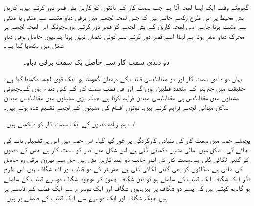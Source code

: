 گھومتے وقت ایک ایسا لمحہ آتا ہے جب سمت کار کے  دانتوں کو کاربن بش  قصر دور کرتے ہیں۔ کاربن بش  محیط پر اس طرح رکھے جاتے ہیں کہ جس لمحہ لچھے میں برقی دباو مثبت سے منفی یا منفی سے مثبت ہونا چاہے اسی لمحہ کاربن کے بش لچھے کو قصر دور کرتے ہوں۔چونکہ اس لمحہ  لچھے پر محرک  دباو صفر ہوتا ہے لہٰذا اسے قصر دور کرنے سے کوئی نقصان نہیں ہوتا ہے۔یوں حاصل برقی دباو شکل   میں دکھایا گیا ہے۔
\begin{figure}
\centering
\caption{دو دندی سمت کار سے حاصل یک سمت  برقی دباو۔}
\label{شکل_یکسمتی_دو_دندوں_کا_سمتکار}
\end{figure}


یہاں دو دندی سمت کار اور دو مقناطیسی قطب کے درمیان گھومتا ہوا ایک قوی لچھا دکھایا گیا ہے۔حقیقت میں جنریٹر کے متعدد قطبین ہوں گے اور فی قطب  سمت کار کے کئی دندے ہوں گے۔چھوٹی مشینوں میں مقناطیس ہی مقناطیسی میدان  فراہم کرتا ہے جبکہ بڑی مشینوں میں مقناطیسی میدان ساکن میدانی لچھے فراہم کرتے ہیں۔ دونوں اقسام کی مشینوں  کے لچھے تقسیم شدہ ہوتے ہیں۔

اب ہم زیادہ دندوں کے ایک سمت کار کو دیکھتے ہیں۔

پچھلے حصہ میں سمت کار کی بنیادی کارکردگی پر غور کیا گیا۔ اس حصہ میں اس پر تفصیلی بات کی جائے گی۔ شکل  میں امالی مشین دکھائی گئی ہے۔اس شکل میں اندر کو سمت کار ہے جس کے دندوں کو گنتی لگائی گئی ہے۔سمت کار کی اندر جانب دو عدد  کاربن بش ہیں جن سے   بیرون  برقی رو  حاصل کی جاتی ہے۔شگافوں کو بھی گنتی لگائی گئی  ہے۔جنریٹر کے دو قطب اور آٹھ شگاف ہیں۔اس طرح اگر ایک شگاف ایک قطب کے سامنے ہو تو تین شگاف چھوڑ کر موجود شگاف دوسرے قطب کے سامنے ہو گا۔ہم کہتے ہیں کہ ایسے دو شگاف   پر ہیں۔یوں شگاف  اور  ایک دوسرے سے ایک قطب کے فاصلے پر ہیں جبکہ    شگاف  اور  ایک دوسرے سے ایک قطب کے فاصلے پر ہیں۔


